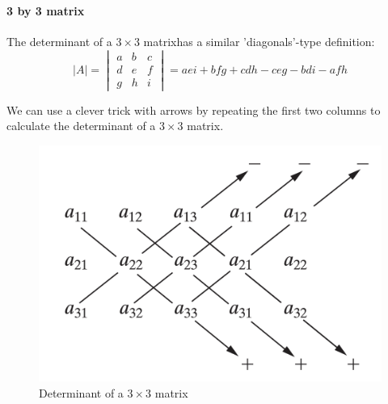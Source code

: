 \documentclass[oneside]{book}
\begin{document}



\paragraph{3 by 3 matrix}
The determinant of a $ 3 \times 3 $ matrixhas a similar 'diagonals'-type definition:
\[
    |A|= \begin{vmatrix}
        a & b & c \\
        d & e & f \\
        g & h & i
    \end{vmatrix}
    = aei + bfg + cdh - ceg - bdi - afh
\]


We can use a clever trick with arrows by repeating the first two columns to calculate the determinant of a $3 \times 3$ matrix.



\begin{figure}
    \begin{center}
        \includegraphics[scale=0.1]{img/Snipaste_2024-03-27_13-52-06.png}
        \caption{Determinant of a $3 \times 3$ matrix}
    \end{center}
\end{figure}
\end{document}
